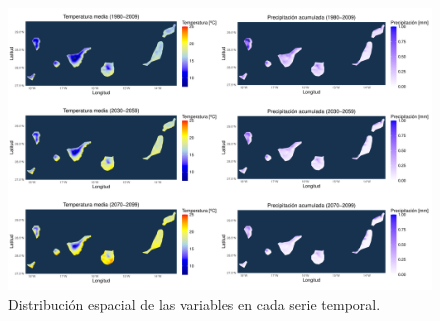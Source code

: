 \documentclass[9pt,twocolumn,twoside]{opticajnl}
\begin{document}
\addtocounter{figure}{2}
\begin{figure}
\centering
\includegraphics[width=\textwidth]{fotos/map_esp.pdf}
\caption{Distribución espacial de las variables en cada serie temporal.}
\label{fig:4}
\end{figure}
\end{document}
